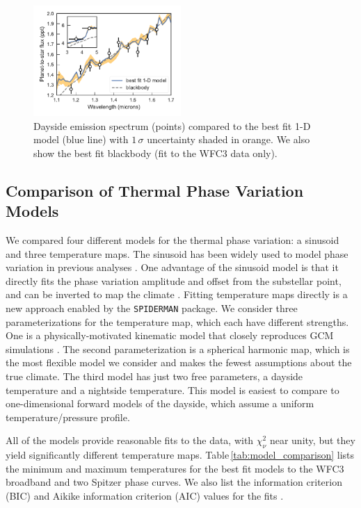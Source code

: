 \documentclass[twocolumn]{aastex61}
\begin{document}
\begin{figure}
\includegraphics[width = 0.5\textwidth]{Figures/dayside_spectrum.pdf}
\caption{Dayside emission spectrum (points) compared to the best fit 1-D model (blue line) with $1\,\sigma$ uncertainty shaded in orange. We also show the best fit blackbody (fit to the WFC3 data only).}
\label{fig:dayside}
\end{figure}


\subsection{Comparison of Thermal Phase Variation Models}
We compared four different models for the thermal phase variation: a sinusoid and three temperature maps. The sinusoid has been widely used to model phase variation in previous analyses \citep[e.g.][]{knutson09, stevenson14}. One advantage of the sinusoid model is that it directly fits the phase variation amplitude and offset from the substellar point, and can be inverted to map the climate \citep{cowan08}. Fitting temperature maps directly is a new approach enabled by the \texttt{SPIDERMAN} package.  We consider three parameterizations for the temperature map, which each have different strengths. One is a physically-motivated kinematic model that closely reproduces GCM simulations \citep{zhang17}.  The second parameterization is a spherical harmonic map, which is the most flexible model we consider and makes the fewest assumptions about the true climate. The third model has just two free parameters, a dayside temperature and a nightside temperature. This model is easiest to compare to one-dimensional forward models of the dayside, which assume a uniform temperature/pressure profile.  

All of the models provide reasonable fits to the data, with $\chi^2_\nu$ near unity, but they yield significantly different temperature maps. Table\,\ref{tab:model_comparison} lists the minimum and maximum temperatures for the best fit models to the WFC3 broadband and two Spitzer phase curves. We also list the  information criterion (BIC) and Aikike information criterion (AIC) values for the fits \citep[a $\Delta$BIC value greater than 10 constitutes strong evidence against a given model;][]{kass95}.
\end{document}
